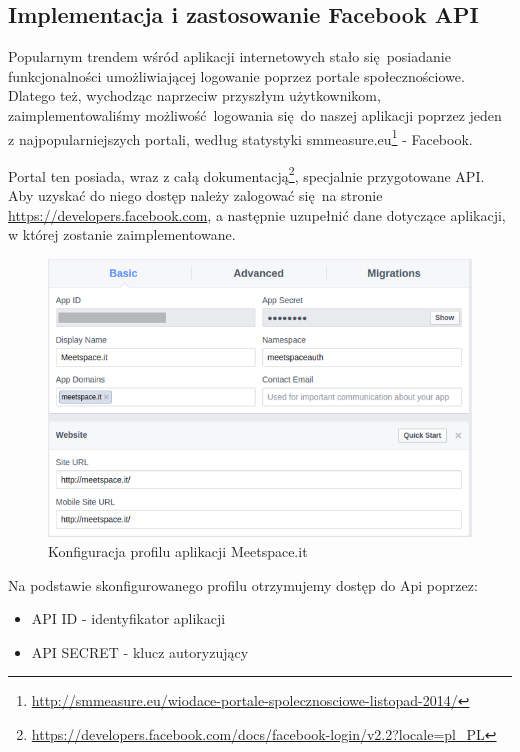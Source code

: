   

\subsection{Implementacja i zastosowanie Facebook API}
Popularnym trendem wśród aplikacji internetowych stało się posiadanie funkcjonalności umożliwiającej logowanie poprzez portale społecznościowe. Dlatego też, wychodząc naprzeciw przyszłym użytkownikom, zaimplementowaliśmy możliwość logowania się do naszej aplikacji poprzez jeden z najpopularniejszych portali, według statystyki smmeasure.eu\footnote{\url{http://smmeasure.eu/wiodace-portale-spolecznosciowe-listopad-2014/}} - Facebook.

Portal ten posiada, wraz z całą dokumentacją\footnote{\url{https://developers.facebook.com/docs/facebook-login/v2.2?locale=pl\_PL}}, specjalnie przygotowane API. Aby uzyskać do niego dostęp należy zalogować się na stronie \url{https://developers.facebook.com}, a następnie uzupełnić dane dotyczące aplikacji, w której zostanie zaimplementowane.

\begin{figure}[h]
  \centering
    \includegraphics[scale=0.65]{images/fb_settings.png}
  \caption{Konfiguracja profilu aplikacji Meetspace.it}
\end{figure}

\clearpage

Na podstawie skonfigurowanego profilu otrzymujemy dostęp do Api poprzez:

\begin{itemize}
  \item API ID - identyfikator aplikacji
  \item API SECRET - klucz autoryzujący
\end{itemize}

